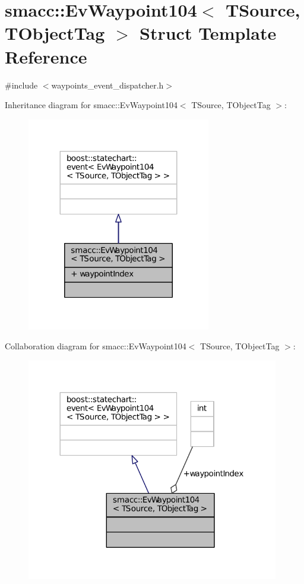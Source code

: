\hypertarget{structsmacc_1_1EvWaypoint104}{}\section{smacc\+:\+:Ev\+Waypoint104$<$ T\+Source, T\+Object\+Tag $>$ Struct Template Reference}
\label{structsmacc_1_1EvWaypoint104}


{\ttfamily \#include $<$waypoints\+\_\+event\+\_\+dispatcher.\+h$>$}



Inheritance diagram for smacc\+:\+:Ev\+Waypoint104$<$ T\+Source, T\+Object\+Tag $>$\+:
\nopagebreak
\begin{figure}[H]
\begin{center}
\leavevmode
\includegraphics[width=227pt]{structsmacc_1_1EvWaypoint104__inherit__graph}
\end{center}
\end{figure}


Collaboration diagram for smacc\+:\+:Ev\+Waypoint104$<$ T\+Source, T\+Object\+Tag $>$\+:
\nopagebreak
\begin{figure}[H]
\begin{center}
\leavevmode
\includegraphics[width=312pt]{structsmacc_1_1EvWaypoint104__coll__graph}
\end{center}
\end{figure}
